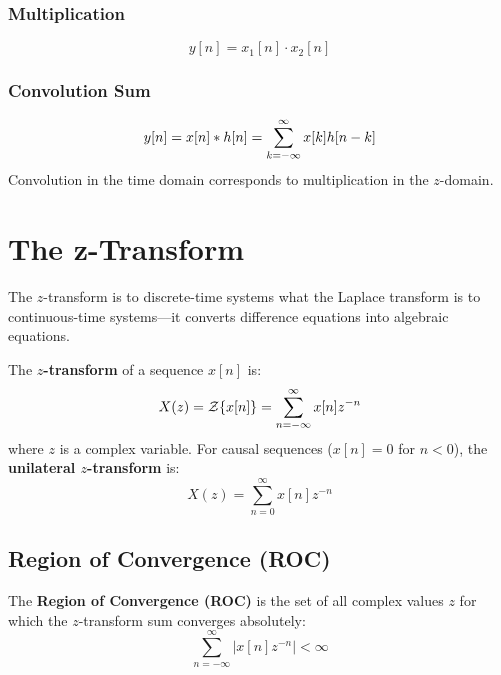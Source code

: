 \subsubsection{Multiplication}
\begin{equation}
y[n] = x_1[n] \cdot x_2[n]
\end{equation}

\subsubsection{Convolution Sum}
\begin{equation}
y[n] = x[n] \ast h[n] = \sum_{k=-\infty}^{\infty} x[k] h[n-k]
\end{equation}
Convolution in the time domain corresponds to multiplication in the $z$-domain.

\section{The z-Transform}

The $z$-transform is to discrete-time systems what the Laplace transform is to continuous-time systems---it converts difference equations into algebraic equations.

\begin{definitionbox}[title=Definition: $z$-Transform]
The \textbf{$z$-transform} of a sequence $x[n]$ is:
\begin{equation}
X(z) = \mathcal{Z}\{x[n]\} = \sum_{n=-\infty}^{\infty} x[n] z^{-n}
\end{equation}
where $z$ is a complex variable. For causal sequences ($x[n] = 0$ for $n < 0$), the \textbf{unilateral $z$-transform} is:
\begin{equation}
X(z) = \sum_{n=0}^{\infty} x[n] z^{-n}
\end{equation}
\end{definitionbox}

\subsection{Region of Convergence (ROC)}

\begin{definitionbox}[title=Definition: Region of Convergence]
The \textbf{Region of Convergence (ROC)} is the set of all complex values $z$ for which the $z$-transform sum converges absolutely:
\begin{equation}
\sum_{n=-\infty}^{\infty} |x[n] z^{-n}| < \infty
\end{equation}
\end{definitionbox}

